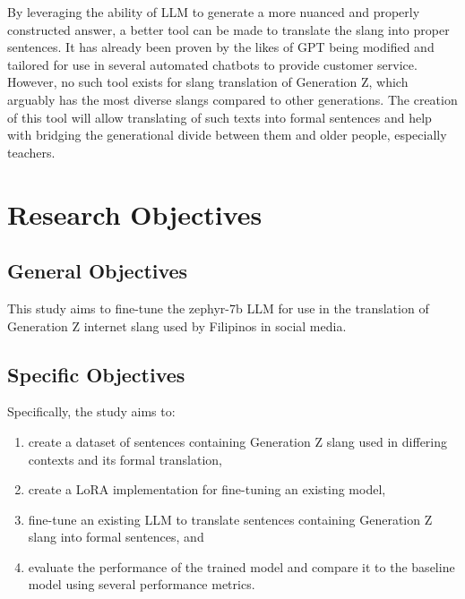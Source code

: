 By leveraging the ability of LLM to generate a more nuanced and properly constructed answer, a better tool can be made to translate the slang into proper sentences.
It has already been proven by the likes of GPT being modified and tailored for use in several automated chatbots to provide customer service.
However, no such tool exists for slang translation of Generation Z, which arguably has the most diverse slangs compared to other generations.
The creation of this tool will allow translating of such texts into formal sentences and help with bridging the generational divide between them and older people, especially teachers. 

\section{Research Objectives}
\label{sec:research_objectives}

\subsection{General Objectives}
\label{sec:general_objectives}
This study aims to fine-tune the zephyr-7b LLM for use in the translation of Generation Z internet slang used by Filipinos in social media.
\subsection{Specific Objectives}
\label{sec:specific_objectives}
Specifically, the study aims to:
\begin{enumerate}
	\item create a dataset of sentences containing Generation Z slang used in differing contexts and its formal translation,
	\item create a LoRA implementation for fine-tuning an existing model,
	\item fine-tune an existing LLM to translate sentences containing Generation Z slang into formal sentences, and
	\item evaluate the performance of the trained model and compare it to the baseline model using several performance metrics.
\end{enumerate}


